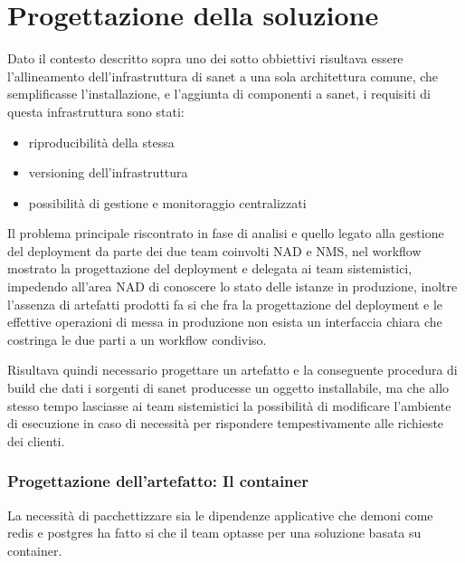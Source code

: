 \chapter{Progettazione della soluzione}

Dato il contesto descritto sopra uno dei sotto obbiettivi risultava essere l'allineamento dell'infrastruttura di sanet a una sola architettura comune, che semplificasse l'installazione, e l'aggiunta di componenti a sanet, i requisiti di questa infrastruttura sono stati:

\begin{itemize}
\item{riproducibilità della stessa}
\item{versioning dell'infrastruttura}
\item{possibilità di gestione e monitoraggio centralizzati}
\end{itemize}

Il problema principale riscontrato in fase di analisi e quello legato alla gestione del deployment da parte dei due team coinvolti NAD e NMS, nel workflow mostrato la progettazione del deployment e delegata ai team sistemistici, impedendo all'area NAD di conoscere lo stato delle istanze in produzione, inoltre l'assenza di artefatti prodotti fa si che fra la progettazione del deployment e le effettive operazioni di messa in produzione non esista un interfaccia chiara che costringa le due parti a un workflow condiviso.

Risultava quindi necessario progettare un artefatto e la conseguente procedura di build che dati i sorgenti di sanet producesse un oggetto installabile, ma che allo stesso tempo lasciasse ai team sistemistici la possibilità di modificare l'ambiente di esecuzione in caso di necessità per rispondere tempestivamente alle richieste dei clienti.

\newpage
\subsection{Progettazione dell'artefatto: Il container}

La necessità di pacchettizzare sia le dipendenze applicative che demoni come redis e postgres ha fatto si che il team optasse per una soluzione basata su container.

